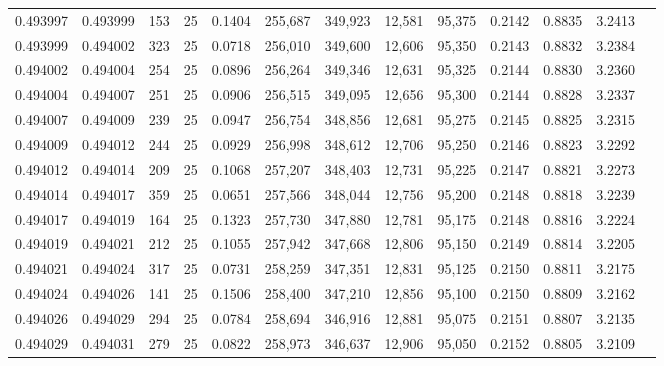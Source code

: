 \begin{tabular}{rrrrrrrrrrrrr}
0.493997 & 0.493999 &   153 &  25 &                                     0.1404 & 255,687 & 349,923 &  12,581 &  95,375 & 0.2142 & 0.8835 & 3.2413 \\
0.493999 & 0.494002 &   323 &  25 &                                     0.0718 & 256,010 & 349,600 &  12,606 &  95,350 & 0.2143 & 0.8832 & 3.2384 \\
0.494002 & 0.494004 &   254 &  25 &                                     0.0896 & 256,264 & 349,346 &  12,631 &  95,325 & 0.2144 & 0.8830 & 3.2360 \\
0.494004 & 0.494007 &   251 &  25 &                                     0.0906 & 256,515 & 349,095 &  12,656 &  95,300 & 0.2144 & 0.8828 & 3.2337 \\
0.494007 & 0.494009 &   239 &  25 &                                     0.0947 & 256,754 & 348,856 &  12,681 &  95,275 & 0.2145 & 0.8825 & 3.2315 \\
0.494009 & 0.494012 &   244 &  25 &                                     0.0929 & 256,998 & 348,612 &  12,706 &  95,250 & 0.2146 & 0.8823 & 3.2292 \\
0.494012 & 0.494014 &   209 &  25 &                                     0.1068 & 257,207 & 348,403 &  12,731 &  95,225 & 0.2147 & 0.8821 & 3.2273 \\
0.494014 & 0.494017 &   359 &  25 &                                     0.0651 & 257,566 & 348,044 &  12,756 &  95,200 & 0.2148 & 0.8818 & 3.2239 \\
0.494017 & 0.494019 &   164 &  25 &                                     0.1323 & 257,730 & 347,880 &  12,781 &  95,175 & 0.2148 & 0.8816 & 3.2224 \\
0.494019 & 0.494021 &   212 &  25 &                                     0.1055 & 257,942 & 347,668 &  12,806 &  95,150 & 0.2149 & 0.8814 & 3.2205 \\
0.494021 & 0.494024 &   317 &  25 &                                     0.0731 & 258,259 & 347,351 &  12,831 &  95,125 & 0.2150 & 0.8811 & 3.2175 \\
0.494024 & 0.494026 &   141 &  25 &                                     0.1506 & 258,400 & 347,210 &  12,856 &  95,100 & 0.2150 & 0.8809 & 3.2162 \\
0.494026 & 0.494029 &   294 &  25 &                                     0.0784 & 258,694 & 346,916 &  12,881 &  95,075 & 0.2151 & 0.8807 & 3.2135 \\
0.494029 & 0.494031 &   279 &  25 &                                     0.0822 & 258,973 & 346,637 &  12,906 &  95,050 & 0.2152 & 0.8805 & 3.2109 \\

\end{tabular}
